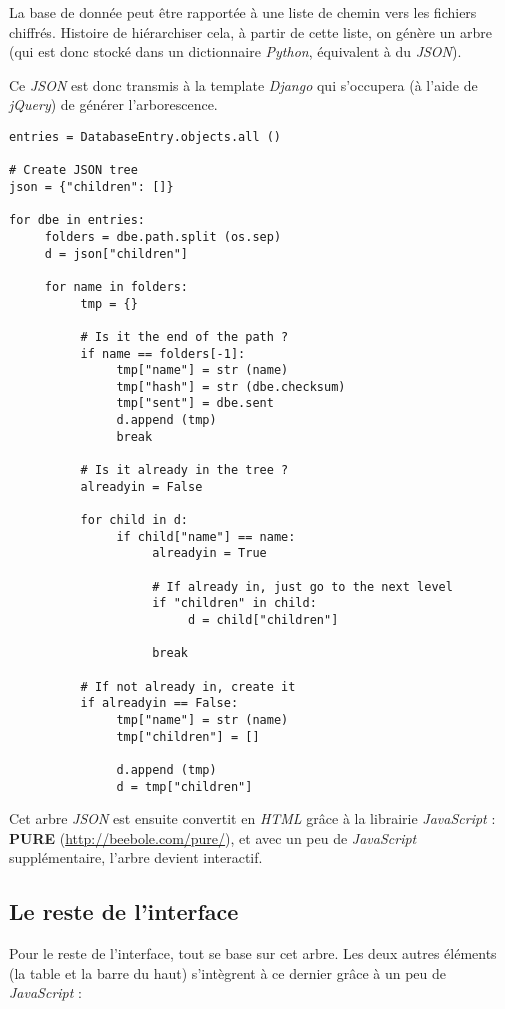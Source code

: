 La base de donnée peut être rapportée à une liste de chemin vers les fichiers chiffrés. Histoire
de hiérarchiser cela, à partir de cette liste, on génère un arbre (qui est donc stocké dans un
dictionnaire \textit{Python}, équivalent à du \textit{JSON}).

Ce \textit{JSON} est donc transmis à la template \textit{Django} qui s'occupera (à l'aide de \textit{jQuery})
de générer l'arborescence.

\begin{verbatim}
entries = DatabaseEntry.objects.all ()

# Create JSON tree
json = {"children": []}

for dbe in entries:
     folders = dbe.path.split (os.sep)
     d = json["children"]

     for name in folders:
          tmp = {}

          # Is it the end of the path ?
          if name == folders[-1]:
               tmp["name"] = str (name)
               tmp["hash"] = str (dbe.checksum)
               tmp["sent"] = dbe.sent
               d.append (tmp)
               break

          # Is it already in the tree ?
          alreadyin = False

          for child in d:
               if child["name"] == name:
                    alreadyin = True

                    # If already in, just go to the next level
                    if "children" in child:
                         d = child["children"]

                    break

          # If not already in, create it
          if alreadyin == False:
               tmp["name"] = str (name)
               tmp["children"] = []

               d.append (tmp)
               d = tmp["children"]
\end{verbatim}

Cet arbre \textit{JSON} est ensuite convertit en \textit{HTML} grâce à la librairie \textit{JavaScript} :
\textbf{PURE} (\url{http://beebole.com/pure/}), et avec un peu de \textit{JavaScript} supplémentaire, l'arbre
devient interactif.

\subsection{Le reste de l'interface}

Pour le reste de l'interface, tout se base sur cet arbre. Les deux autres éléments (la table et la barre du haut)
s'intègrent à ce dernier grâce à un peu de \textit{JavaScript} :

